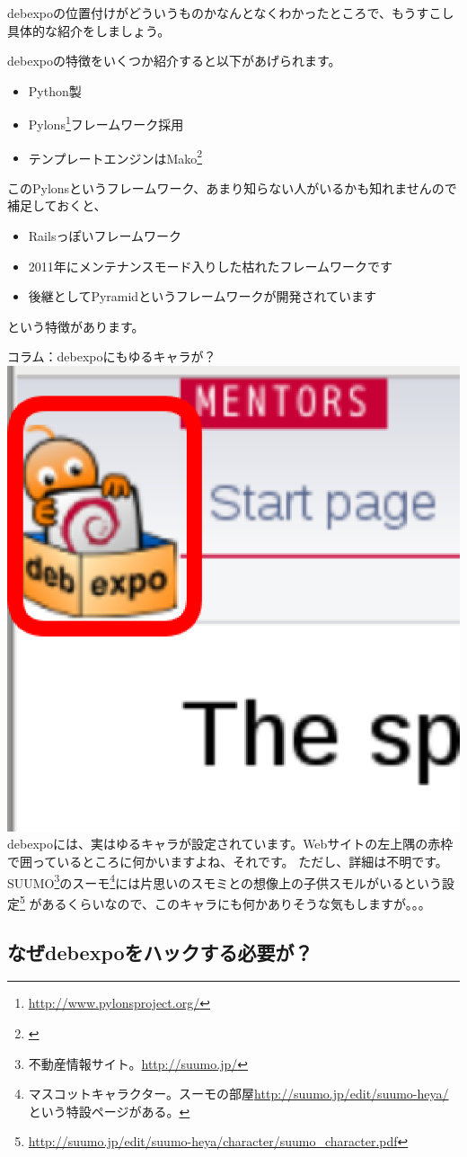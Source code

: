 \documentclass[mingoth,a4paper]{jsarticle}
\begin{document}
debexpoの位置付けがどういうものかなんとなくわかったところで、もうすこし具体的な紹介をしましょう。

debexpoの特徴をいくつか紹介すると以下があげられます。

\begin{itemize}
\item Python製
\item Pylons\footnote{\url{http://www.pylonsproject.org/}}フレームワーク採用
\item テンプレートエンジンはMako\footnote{\url{}}
\end{itemize}

このPylonsというフレームワーク、あまり知らない人がいるかも知れませんので補足しておくと、

\begin{itemize}
\item Railsっぽいフレームワーク
\item 2011年にメンテナンスモード入りした枯れたフレームワークです
\item 後継としてPyramidというフレームワークが開発されています
\end{itemize}

という特徴があります。

\begin{itembox}[l]{コラム：debexpoにもゆるキャラが？}
\includegraphics[width=0.2\hsize]{image201606/debexpo-mascot-zoom.eps}
debexpoには、実はゆるキャラが設定されています。Webサイトの左上隅の赤枠で囲っているところに何かいますよね、それです。
ただし、詳細は不明です。SUUMO\footnote{不動産情報サイト。\url{http://suumo.jp/}}のスーモ\footnote{マスコットキャラクター。スーモの部屋\url{http://suumo.jp/edit/suumo-heya/}という特設ページがある。}には片思いのスモミとの想像上の子供スモルがいるという設定\footnote{\url{http://suumo.jp/edit/suumo-heya/character/suumo_character.pdf}}
があるくらいなので、このキャラにも何かありそうな気もしますが。。。
\end{itembox}

\subsection{なぜdebexpoをハックする必要が？}
\end{document}

